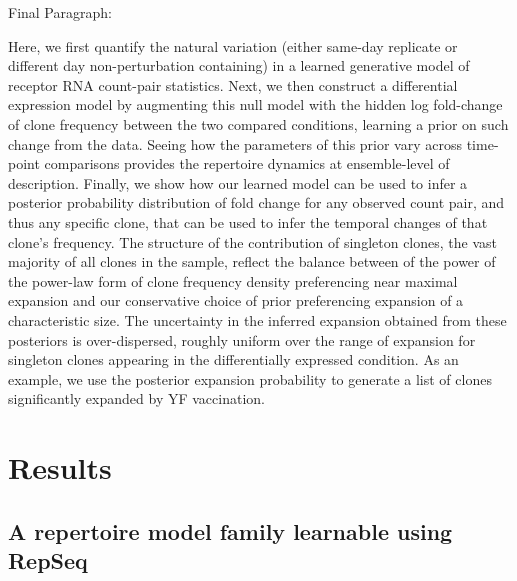 \documentclass[letterpaper,english,prl,reprint,longbibliography]{revtex4-1} %
\begin{document}
Final Paragraph:

Here, we first quantify the natural variation (either same-day replicate or different day non-perturbation containing) in a learned generative model of receptor RNA count-pair statistics. Next, we then construct a differential expression model by augmenting this null model with the hidden log fold-change of clone frequency between the two compared conditions, learning a prior on such change from the data. Seeing how the parameters of this prior vary across time-point comparisons provides the repertoire dynamics at ensemble-level of description. Finally, we show how our learned model can be used to infer a posterior probability distribution of fold change for any observed count pair, and thus any specific clone, that can be used to infer the temporal changes of that clone's frequency. The structure of the contribution of singleton clones, the vast majority of all clones in the sample, reflect the balance between of the power of the power-law form of clone frequency density preferencing near maximal expansion and our conservative choice of prior preferencing expansion of a characteristic size. The uncertainty in the inferred expansion obtained from these posteriors is over-dispersed, roughly uniform over the range of expansion for singleton clones appearing in the differentially expressed condition.  As an example, we use the posterior expansion probability to generate a list of clones significantly expanded by YF vaccination. 

\section*{Results}

\subsection*{A repertoire model family learnable using RepSeq}
\end{document}
